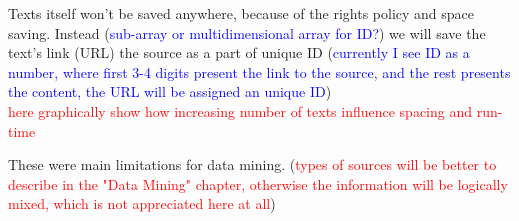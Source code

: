 \documentclass[11pt]{article}
\begin{document}
\begin{enumerate}
\begin{enumerate}
	\end{enumerate}  
Texts itself won't be saved anywhere, because of the rights policy and space saving. Instead (\textcolor{blue}{sub-array or multidimensional array for ID?}) we will save the text's link (URL) the source as a part of unique ID (\textcolor{blue}{currently I see ID as a number, where first 3-4 digits present the link to the source, and the rest presents the content, the URL will be assigned an unique ID})\\
\textcolor{red}{here graphically show how increasing number of texts influence spacing and run-time}
\end{enumerate}
These were main limitations for data mining. (\textcolor{red}{types of sources  will be better to describe in the "Data Mining" chapter, otherwise the information will be logically mixed, which is not appreciated here at all})

\newpage
\end{document}
